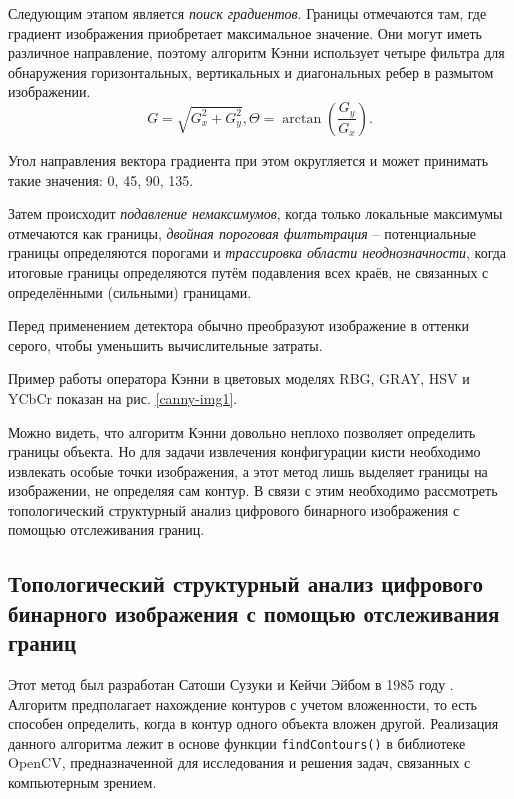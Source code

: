Следующим этапом является {\it поиск градиентов}. Границы отмечаются 
там, где градиент изображения приобретает максимальное значение. Они 
могут иметь различное направление, поэтому алгоритм Кэнни использует
четыре фильтра для обнаружения горизонтальных, вертикальных и 
диагональных ребер в размытом изображении.
\begin{equation}
    G = \sqrt{G_x^2 + G_y^2},
    \Theta = \arctan (\frac{G_y}{G_x}).
	\label{canny-2}
\end{equation}

Угол направления вектора градиента при этом округляется и может 
принимать такие значения: 0\textdegree, 45\textdegree, 90\textdegree,
135\textdegree.

Затем происходит {\it подавление немаксимумов}, когда только локальные
максимумы отмечаются как границы, {\it двойная пороговая филтьтрация}
-- потенциальные границы определяются порогами и {\it трассировка
области неоднозначности}, когда итоговые границы определяются путём 
подавления всех краёв, не связанных с определёнными (сильными) 
границами.

Перед применением детектора обычно преобразуют изображение в оттенки
серого, чтобы уменьшить вычислительные затраты. 

Пример работы оператора Кэнни в цветовых моделях RBG, GRAY, HSV и YCbCr 
показан на рис. \ref{canny-img1}.



Можно видеть, что алгоритм Кэнни довольно неплохо позволяет определить
границы объекта. Но для задачи извлечения конфигурации кисти 
необходимо извлекать особые точки изображения, а этот метод лишь 
выделяет границы на изображении, не определяя сам контур. В связи с
этим необходимо рассмотреть топологический структурный анализ цифрового
бинарного изображения с помощью отслеживания границ.

\subsection{Топологический структурный анализ цифрового бинарного
изображения с помощью отслеживания границ}

Этот метод был разработан Сатоши Сузуки и Кейчи Эйбом в 1985 году
\cite{satoshi}. Алгоритм предполагает нахождение контуров с учетом
вложенности, то есть способен определить, когда в контур одного объекта
вложен другой. Реализация данного алгоритма лежит в основе функции
{\tt findContours()} в библиотеке OpenCV, предназначенной для 
исследования и решения задач, связанных с компьютерным зрением. 

